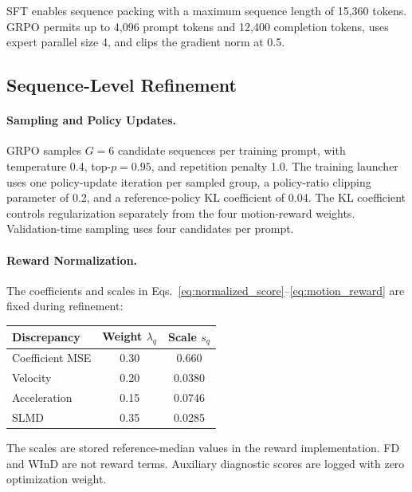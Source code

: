 SFT enables sequence packing with a maximum sequence length of 15,360 tokens.
GRPO permits up to 4,096 prompt tokens and 12,400 completion tokens, uses expert parallel size 4, and clips the gradient norm at 0.5.

\subsection{Sequence-Level Refinement}
\label{app:refinement}

\paragraph{Sampling and Policy Updates.}
GRPO samples $G=6$ candidate sequences per training prompt, with temperature 0.4, top-$p=0.95$, and repetition penalty 1.0.
The training launcher uses one policy-update iteration per sampled group, a policy-ratio clipping parameter of 0.2, and a reference-policy KL coefficient of 0.04.
The KL coefficient controls regularization separately from the four motion-reward weights.
Validation-time sampling uses four candidates per prompt.

\paragraph{Reward Normalization.}
The coefficients and scales in Eqs.~\ref{eq:normalized_score}--\ref{eq:motion_reward} are fixed during refinement:
\begin{center}
\small
\begin{tabular}{lcc}
\hline
Discrepancy & Weight $\lambda_q$ & Scale $s_q$ \\
\hline
Coefficient MSE & 0.30 & 0.660 \\
Velocity & 0.20 & 0.0380 \\
Acceleration & 0.15 & 0.0746 \\
SLMD & 0.35 & 0.0285 \\
\hline
\end{tabular}
\end{center}
The scales are stored reference-median values in the reward implementation.
FD and WInD are not reward terms. Auxiliary diagnostic scores are logged with zero optimization weight.

